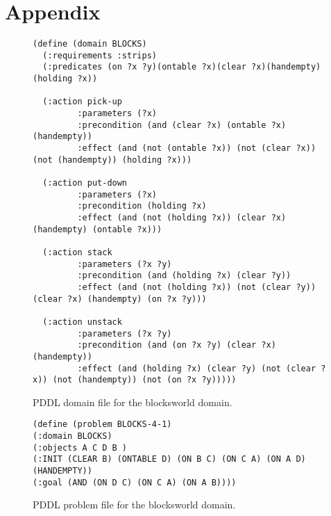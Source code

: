 \section*{Appendix}
\label{sec:appendix}


\begin{figure}[hbtp!]
\begin{scriptsize}  
\begin{verbatim}
(define (domain BLOCKS)
  (:requirements :strips)
  (:predicates (on ?x ?y)(ontable ?x)(clear ?x)(handempty)(holding ?x))

  (:action pick-up
	     :parameters (?x)
	     :precondition (and (clear ?x) (ontable ?x) (handempty))
	     :effect (and (not (ontable ?x)) (not (clear ?x)) (not (handempty)) (holding ?x)))

  (:action put-down
	     :parameters (?x)
	     :precondition (holding ?x)
	     :effect (and (not (holding ?x)) (clear ?x) (handempty) (ontable ?x)))

  (:action stack
	     :parameters (?x ?y)
	     :precondition (and (holding ?x) (clear ?y))
	     :effect (and (not (holding ?x)) (not (clear ?y)) (clear ?x) (handempty) (on ?x ?y)))

  (:action unstack
	     :parameters (?x ?y)
	     :precondition (and (on ?x ?y) (clear ?x) (handempty))
	     :effect (and (holding ?x) (clear ?y) (not (clear ?x)) (not (handempty)) (not (on ?x ?y)))))
  \end{verbatim}
\end{scriptsize}  
\caption{\small PDDL domain file for the blocksworld domain.}
\label{fig:bw-domain}
\end{figure}


\begin{figure}[hbtp!]
\begin{scriptsize}  
  \begin{verbatim}
(define (problem BLOCKS-4-1)
(:domain BLOCKS)
(:objects A C D B )
(:INIT (CLEAR B) (ONTABLE D) (ON B C) (ON C A) (ON A D) (HANDEMPTY))
(:goal (AND (ON D C) (ON C A) (ON A B))))
  \end{verbatim}
\end{scriptsize}  
\caption{\small PDDL problem file for the blocksworld domain.}
\label{fig:bw-problem}
\end{figure}    

